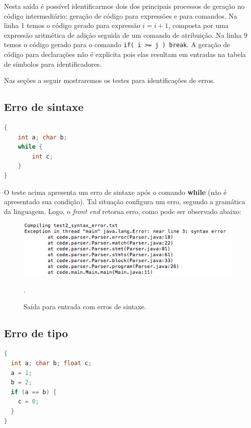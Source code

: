 Nesta saída é possível identificarmos dois dos principais processos de geração no código intermediário: geração de código para expressões e para comandos. Na linha 1 temos o código gerado para expressão $i = i + 1$, composta por uma expressão aritmética de adição seguida de um comando de atribuição. Na linha 9 temos o código gerado para o comando \texttt{if( i >= j ) break}. A geração de código para declarações não é explícita pois elas resultam em entradas na tabela de símbolos para identificadores.

Nas seções a seguir mostraremos os testes para identificações de erros.

\subsection{Erro de sintaxe}

\begin{lstlisting}[language=C, caption=Teste de erro de sintaxe.]
{
    int a; char b;
    while {
        int c;
    }
}
\end{lstlisting}

O teste acima apresenta um erro de sintaxe após o comando \textbf{while} (não é apresentado sua condição). Tal situação configura um erro, segundo a gramática da linguagem. Logo, o \textit{front end} retorna erro, como pode ser observado abaixo:

\begin{figure}[H]
    \includegraphics[width=1\textwidth]{imgs/test2.png}
    \caption{Saída para entrada com erros de sintaxe.}.
    \label{fig:test2}
\end{figure}


\subsection{Erro de tipo}

\begin{lstlisting}[language=C, caption=Teste de erro de tipo.]
{
  int a; char b; float c;
  a = 1;
  b = 2;
  if (a == b) {
    c = 0;
  }
}
\end{lstlisting}

